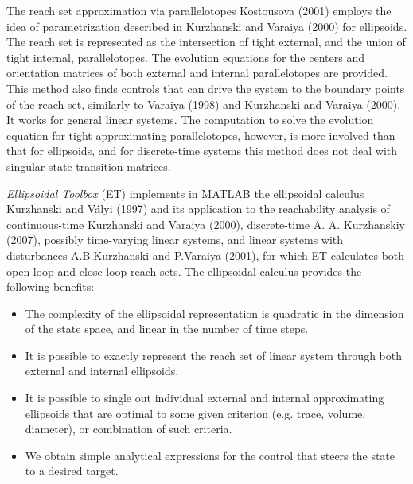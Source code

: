 \documentclass[letterpaper,10pt,english]{sphinxmanual}
\begin{document}
The reach set approximation via parallelotopes Kostousova (2001) employs
the idea of parametrization described in Kurzhanski and Varaiya (2000)
for ellipsoids. The reach set is represented as the intersection of
tight external, and the union of tight internal, parallelotopes. The
evolution equations for the centers and orientation matrices of both
external and internal parallelotopes are provided. This method also
finds controls that can drive the system to the boundary points of the
reach set, similarly to Varaiya (1998) and Kurzhanski and Varaiya
(2000). It works for general linear systems. The computation to solve
the evolution equation for tight approximating parallelotopes, however,
is more involved than that for ellipsoids, and for discrete-time systems
this method does not deal with singular state transition matrices.

\emph{Ellipsoidal Toolbox} (ET) implements in MATLAB the ellipsoidal calculus
Kurzhanski and Vályi (1997) and its application to the reachability
analysis of continuous-time Kurzhanski and Varaiya (2000), discrete-time
A. A. Kurzhanskiy (2007), possibly time-varying linear systems, and
linear systems with disturbances A.B.Kurzhanski and P.Varaiya (2001),
for which ET calculates both open-loop and close-loop reach sets. The
ellipsoidal calculus provides the following benefits:
\begin{itemize}
\item {} 
The complexity of the ellipsoidal representation is quadratic in the
dimension of the state space, and linear in the number of time steps.

\item {} 
It is possible to exactly represent the reach set of linear system
through both external and internal ellipsoids.

\item {} 
It is possible to single out individual external and internal
approximating ellipsoids that are optimal to some given criterion
(e.g. trace, volume, diameter), or combination of such criteria.

\item {} 
We obtain simple analytical expressions for the control that steers
the state to a desired target.

\end{itemize}
\end{document}
